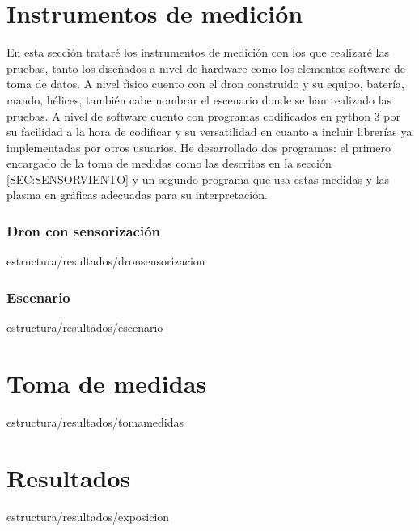 
\section{Instrumentos de medición\label{SEC:INSTR}}
	En esta sección trataré los instrumentos de medición con los que realizaré las pruebas, tanto los diseñados a nivel de hardware como los elementos software de toma de datos. 
	A nivel físico cuento con el dron construido y su equipo, batería, mando, hélices, también cabe nombrar el escenario donde se han realizado las pruebas. A nivel de software cuento con programas codificados en python 3 por su facilidad a la hora de codificar y su versatilidad en cuanto a incluir librerías ya implementadas por otros usuarios. He desarrollado dos programas: el primero encargado de la toma de medidas como las descritas en la sección \ref{SEC:SENSORVIENTO} y un segundo programa que usa estas medidas y las plasma en gráficas adecuadas para su interpretación.
	
	\subsubsection{Dron con sensorización\label{SS:DRONSENS}}{estructura/resultados/dronsensorizacion}
	\subsubsection{Escenario\label{SS:ESCENARIO}}{estructura/resultados/escenario}
\section{Toma de medidas\label{SEC:TOMAMEDIDAS}}{estructura/resultados/tomamedidas}
\section{Resultados\label{SEC:EXPOSICION}}{estructura/resultados/exposicion}

